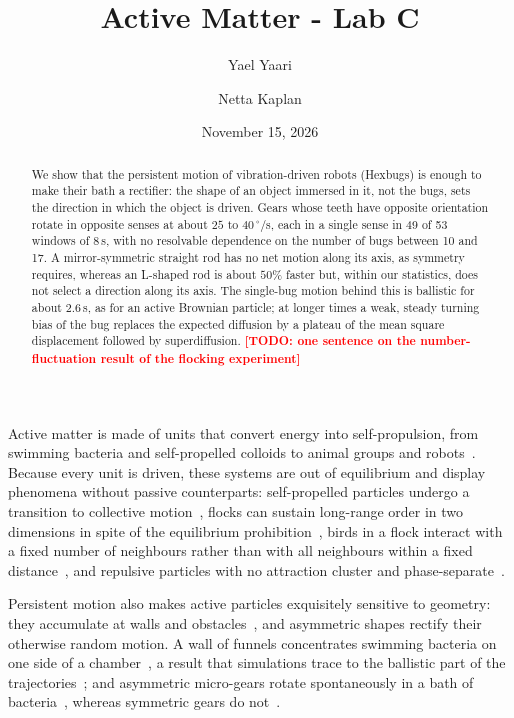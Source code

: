 \documentclass[11pt]{article}
\title{\vspace{-1.5em}Active Matter - Lab C}
\author{Yael Yaari \and Netta Kaplan\\[0.3em]}
\date{November 15, 2026}
\newcommand{\todo}[1]{\textcolor{red}{\textbf{[TODO: #1]}}}
\begin{document}
\maketitle

\begin{abstract}
We show that the persistent motion of vibration-driven robots (Hexbugs) is enough to make their bath a rectifier: the shape of an object immersed in it, not the bugs, sets the direction in which the object is driven.
Gears whose teeth have opposite orientation rotate in opposite senses at about $25$ to $40\,^\circ$/s, each in a single sense in 49 of 53 windows of $8\,$s, with no resolvable dependence on the number of bugs between 10 and 17.
A mirror-symmetric straight rod has no net motion along its axis, as symmetry requires, whereas an L-shaped rod is about $50\%$ faster but, within our statistics, does not select a direction along its axis.
The single-bug motion behind this is ballistic for about $2.6\,$s, as for an active Brownian particle; at longer times a weak, steady turning bias of the bug replaces the expected diffusion by a plateau of the mean square displacement followed by superdiffusion.
\todo{one sentence on the number-fluctuation result of the flocking experiment}
\end{abstract}

Active matter is made of units that convert energy into self-propulsion, from swimming bacteria and self-propelled colloids to animal groups and robots~\cite{Marchetti2013,Bechinger2016,VicsekZafeiris2012}.
Because every unit is driven, these systems are out of equilibrium and display phenomena without passive counterparts: self-propelled particles undergo a transition to collective motion~\cite{Vicsek1995}, flocks can sustain long-range order in two dimensions in spite of the equilibrium prohibition~\cite{TonerTu1995}, birds in a flock interact with a fixed number of neighbours rather than with all neighbours within a fixed distance~\cite{Ballerini2008}, and repulsive particles with no attraction cluster and phase-separate~\cite{Buttinoni2013,CatesTailleur2015}.

Persistent motion also makes active particles exquisitely sensitive to geometry: they accumulate at walls and obstacles~\cite{Bechinger2016}, and asymmetric shapes rectify their otherwise random motion.
A wall of funnels concentrates swimming bacteria on one side of a chamber~\cite{Galajda2007}, a result that simulations trace to the ballistic part of the trajectories~\cite{Wan2008}; and asymmetric micro-gears rotate spontaneously in a bath of bacteria~\cite{Angelani2009,DiLeonardo2010,Sokolov2010}, whereas symmetric gears do not~\cite{DiLeonardo2010}.
\end{document}
